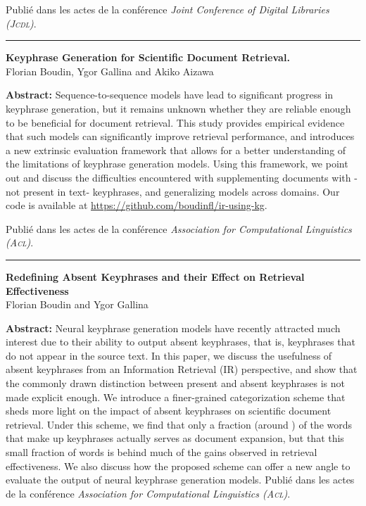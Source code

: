 \noindent
Publié dans les actes de la conférence \textit{Joint Conference of Digital Libraries (\textsc{Jcdl})}.

\vspace{0.25cm}

\noindent\hfil\rule{0.5\textwidth}{.4pt}\hfil


\newpage

\noindent
\textbf{Keyphrase Generation for Scientific Document Retrieval.} \cite{boudin_keyphrase_2020}\\
Florian Boudin, Ygor Gallina and Akiko Aizawa%

\noindent
\textbf{Abstract:}
Sequence-to-sequence models have lead to significant progress in keyphrase generation, but it remains unknown whether they are reliable enough to be beneficial for document retrieval. This study provides empirical evidence that such models can significantly improve retrieval performance, and introduces a new extrinsic evaluation framework that allows for a better understanding of the limitations of keyphrase generation models. Using this framework, we point out and discuss the difficulties encountered with supplementing documents with -not present in text- keyphrases, and generalizing models across domains. Our code is available at \url{https://github.com/boudinfl/ir-using-kg}.

\noindent
Publié dans les actes de la conférence \textit{Association for Computational Linguistics (\textsc{Acl})}.


\noindent\hfil\rule{0.5\textwidth}{.4pt}\hfil

\vspace{0.2cm}

\noindent
\textbf{Redefining Absent Keyphrases and their Effect on Retrieval Effectiveness} \cite{boudin_redefining_2021}\\
Florian Boudin and Ygor Gallina%

\noindent
\textbf{Abstract:}
Neural keyphrase generation models have recently attracted much interest due to their ability to output absent keyphrases, that is, keyphrases that do not appear in the source text. In this paper, we discuss the usefulness of absent keyphrases from an Information Retrieval (IR) perspective, and show that the commonly drawn distinction between present and absent keyphrases is not made explicit enough. We introduce a finer-grained categorization scheme that sheds more light on the impact of absent keyphrases on scientific document retrieval. Under this scheme, we find that only a fraction (around ) of the words that make up keyphrases actually serves as document expansion, but that this small fraction of words is behind much of the gains observed in retrieval effectiveness. We also discuss how the proposed scheme can offer a new angle to evaluate the output of neural keyphrase generation models.
\noindent
Publié dans les actes de la conférence \textit{Association for Computational Linguistics (\textsc{Acl})}.

